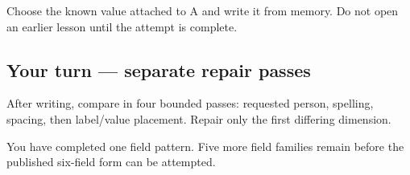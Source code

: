 Choose the known value attached to A and write it from memory. Do not open an earlier lesson until the attempt is complete.

\subsection*{Your turn — separate repair passes}
After writing, compare in four bounded passes: requested person, spelling, spacing, then label/value placement. Repair only the first differing dimension.

\begin{tcolorbox}[breakable,colback=teal!4,colframe=teal!35!black,title={Before you move on}]
You have completed one field pattern. Five more field families remain before the published six-field form can be attempted.
\end{tcolorbox}
